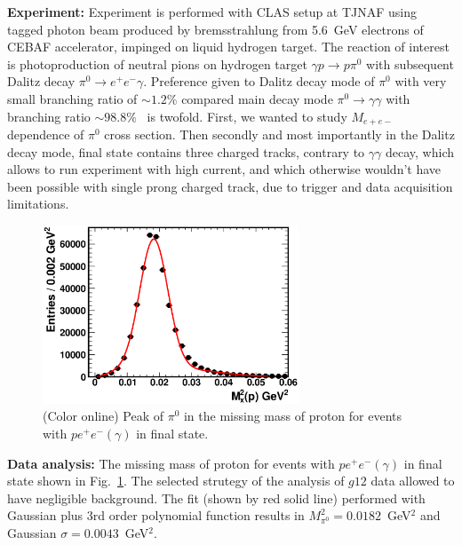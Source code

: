 \documentclass[aps,prc,onecolumn,floatfix,showpacs,preprintnumbers,amsmath,amssymb,superscriptaddress]{revtex4-1}
\begin{document}
\textbf{Experiment:} Experiment is performed with CLAS setup 
at TJNAF using tagged photon beam produced by bremsstrahlung 
from 5.6~GeV electrons of CEBAF accelerator, impinged on 
liquid hydrogen target. The reaction of interest is 
photoproduction of neutral pions on hydrogen target $\gamma 
p\to p\pi^0$ with subsequent Dalitz decay $\pi^0\to e^+e^-
\gamma$. Preference given to Dalitz decay mode of $\pi^0$ 
with very small branching ratio of $\sim 1.2\%$ compared 
main decay mode $\pi^0\to\gamma\gamma$ with branching ratio 
$\sim 98.8\%$~\cite{PDG} is twofold. First, we wanted to 
study $M_{e+e-}$ dependence of $\pi^0$ cross section. Then 
secondly and most importantly in the Dalitz decay mode, final 
state contains three charged tracks, contrary to $\gamma
\gamma$ decay, which allows to run experiment with high 
current, and which otherwise wouldn't have been possible 
with single prong charged track, due to trigger and data 
acquisition limitations.
\begin{figure}[htb!]
\centerline{
        \includegraphics[width=3in, angle=0]{pi0_peak.eps}}

        \caption {(Color online) Peak of $\pi^0$ in the missing
                mass of proton for events with $pe^+e^-(\gamma)$
                in final state.} \label{fig:pi0_peak}
\end{figure}

\textbf{Data analysis:} The missing mass of proton for events 
with $pe^+e^-(\gamma)$ in final state shown in 
Fig.~\ref{fig:pi0_peak}. The selected strutegy of the analysis
of $g12$ data allowed to have negligible background.
The fit (shown by red solid line) performed with Gaussian plus 
3rd order polynomial function results in $M_{\pi^0}^2 = 
0.0182$~GeV$^2$ and Gaussian $\sigma=0.0043$~GeV$^2$.  \\
\end{document}
